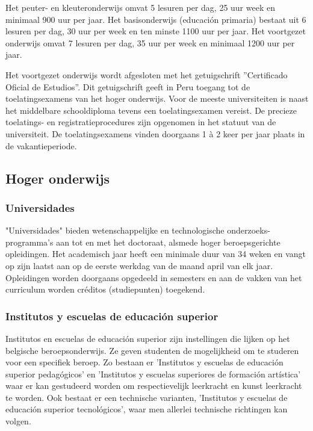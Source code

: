 Het peuter- en kleuteronderwijs omvat 5 lesuren per dag, 25 uur week en minimaal 900 uur per jaar. Het basisonderwijs (educación primaria) bestaat uit 6 lesuren per dag, 30 uur per week en ten minste 1100 uur per jaar. Het voortgezet onderwijs omvat 7 lesuren per dag, 35 uur per week en minimaal 1200 uur per jaar. \autocite{Nuffic2015}

Het voortgezet onderwijs wordt afgesloten met het getuigschrift ''Certificado Oficial de Estudios''. Dit getuigschrift geeft in Peru toegang tot de toelatingsexamens van het hoger onderwijs. Voor de meeste universiteiten is naast het middelbare schooldiploma tevens een toelatingsexamen vereist. De precieze toelatings- en registratieprocedures zijn opgenomen in het statuut van de universiteit. De toelatingsexamens vinden doorgaans 1 à 2 keer per jaar plaats in de vakantieperiode. \autocite{Nuffic2015}

\subsection{Hoger onderwijs}
\subsubsection{Universidades}
 "Universidades" bieden wetenschappelijke en technologische onderzoeks-programma’s aan tot en met het doctoraat, alsmede hoger beroepsgerichte opleidingen. Het academisch jaar heeft een minimale duur van 34 weken en vangt op zijn laatst aan op de eerste werkdag van de maand april van elk jaar. Opleidingen worden doorgaans opgedeeld in semesters en aan de vakken van het curriculum worden créditos (studiepunten) toegekend. \autocite{Nuffic2015}
 
 \subsubsection{Institutos y escuelas de educación superior }
Institutos en escuelas de educación superior zijn instellingen die lijken op het belgische beroepsonderwijs. Ze geven studenten de mogelijkheid om te studeren voor een specifiek beroep. Zo bestaan er 'Institutos y escuelas de educación superior pedagógicos' en 'Institutos y escuelas superiores de formación artística' waar er kan gestudeerd worden om respectievelijk leerkracht en kunst leerkracht te worden. Ook bestaat er een technische varianten, 'Institutos y escuelas de educación superior tecnológicos', waar men allerlei technische richtingen kan volgen. \autocite{Nuffic2015}


